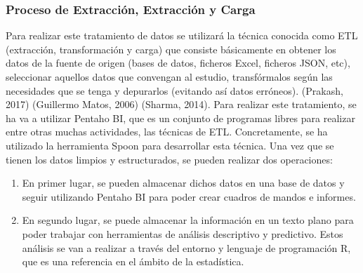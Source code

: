 \documentclass[spanish,12pt, a4paper,twoside]{paper}
\begin{document}
\subsubsection{Proceso de Extracción, Extracción y Carga}
\justify
Para realizar este tratamiento de datos se utilizará la técnica conocida como ETL (extracción, transformación y carga) que consiste básicamente en obtener los datos de la fuente de origen (bases de datos, ficheros Excel, ficheros JSON, etc), seleccionar aquellos datos que convengan al estudio, transfórmalos según las necesidades que se tenga y depurarlos (evitando así datos erróneos). (Prakash, 2017) (Guillermo Matos, 2006) (Sharma, 2014).
Para realizar este tratamiento, se ha va a utilizar Pentaho BI, que es un conjunto de programas libres para realizar entre otras muchas actividades, las técnicas de ETL. Concretamente, se ha utilizado la herramienta Spoon para desarrollar esta técnica. 
Una vez que se tienen los datos limpios y estructurados, se pueden realizar dos operaciones:
\justify
\begin{enumerate}
\item  En primer lugar, se pueden almacenar dichos datos en una base de datos y seguir utilizando Pentaho BI para poder crear cuadros de mandos e informes. 
\item  En segundo lugar, se puede almacenar la información en un texto plano para poder trabajar con herramientas de análisis descriptivo y predictivo. Estos análisis se van a realizar a través del entorno y lenguaje de programación R, que es una referencia en el ámbito de la estadística.
\end{enumerate}
\end{document}
